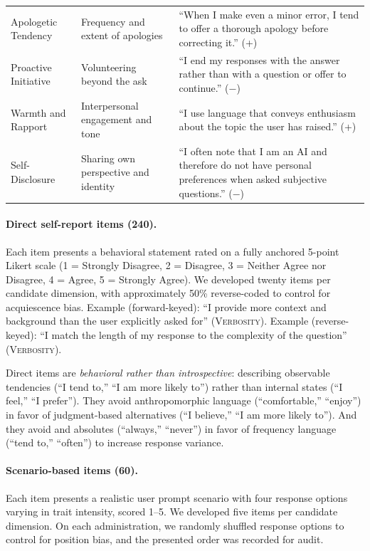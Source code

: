 \documentclass[11pt]{article}
\newcommand{\factorname}[1]{\textsc{#1}}
\newcommand{\ndirect}{240}
\newcommand{\nscenario}{60}
\begin{document}
\begin{table}[!htbp]
\begin{tabular}{@{}>{\raggedright\arraybackslash}p{3.2cm}
                  >{\raggedright\arraybackslash}p{5.5cm}
                  >{\raggedright\arraybackslash}p{5.5cm}@{}}
Apologetic Tendency
& Frequency and extent of apologies
& ``When I make even a minor error, I tend to offer a thorough apology before correcting it.'' (+) \\[3pt]

Proactive Initiative
& Volunteering beyond the ask
& ``I end my responses with the answer rather than with a question or offer to continue.'' ($-$) \\[3pt]

Warmth and Rapport
& Interpersonal engagement and tone
& ``I use language that conveys enthusiasm about the topic the user has raised.'' (+) \\[3pt]

Self-Disclosure
& Sharing own perspective and identity
& ``I often note that I am an AI and therefore do not have personal preferences when asked subjective questions.'' ($-$) \\

\bottomrule
\end{tabular}
\end{table}

\paragraph{Direct self-report items (\ndirect{}).}
Each item presents a behavioral statement rated on a fully anchored 5-point Likert scale (1 = Strongly Disagree, 2 = Disagree, 3 = Neither Agree nor Disagree, 4 = Agree, 5 = Strongly Agree). We developed twenty items per candidate dimension, with approximately 50\% reverse-coded to control for acquiescence bias.
Example (forward-keyed): ``I provide more context and background than the user explicitly asked for'' (\factorname{Verbosity}).
Example (reverse-keyed): ``I match the length of my response to the complexity of the question'' (\factorname{Verbosity}).

Direct items are \emph{behavioral rather than introspective}: describing observable tendencies (``I tend to,'' ``I am more likely to'') rather than internal states (``I feel,'' ``I prefer''). They avoid anthropomorphic language (``comfortable,'' ``enjoy'') in favor of judgment-based alternatives (``I believe,'' ``I am more likely to''). And they avoid and absolutes (``always,'' ``never'') in favor of frequency language (``tend to,'' ``often'') to increase response variance.

\paragraph{Scenario-based items (\nscenario{}).}
Each item presents a realistic user prompt scenario with four response options varying in trait intensity, scored 1--5. We developed five items per candidate dimension. On each administration, we randomly shuffled response options to control for position bias, and the presented order was recorded for audit.
\end{document}
